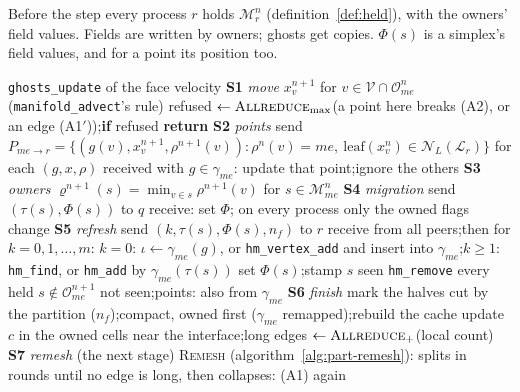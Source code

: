 \documentclass[10pt,a4paper]{article}
\theoremstyle{definition}
\newcommand{\fn}[1]{\texttt{#1}}
\begin{document}
Before the step every process $r$ holds $\mathcal{M}^n_r$
(definition~\ref{def:held}), with the owners' field values. Fields are
written by owners; ghosts get copies. $\Phi(s)$ is a simplex's field
values, and for a point its position too.

\begin{algorithm}[H]
  \caption{\textsc{Step}$(dt)$ on process $me$}
  \label{alg:part-step}
  \begin{algorithmic}[1]
    \State \fn{ghosts\_update} of the face velocity 
    \Statex \textbf{S1} \emph{move}
    \State $x^{n+1}_v$ for $v \in \mathcal{V} \cap \mathcal{O}^n_{me}$
      (\fn{manifold\_advect}'s rule)
    \State refused $\gets \textsc{Allreduce}_{\max}$(a point here breaks
      (A2), or an edge (A1$'$));\quad \textbf{if} refused \textbf{return}
    \Statex \textbf{S2} \emph{points}
      \State send $P_{me \to r} = \{ (g(v), x^{n+1}_v, \rho^{n+1}(v)) :
        \rho^n(v) = me,\ \mathrm{leaf}(x^n_v) \in \mathcal{N}_L(\mathcal{L}_r)
        \}$
    \EndFor
    \State for each $(g, x, \rho)$ received with $g \in \gamma_{me}$: update
      that point;\quad ignore the others 
    \Statex \textbf{S3} \emph{owners}
    \State $\varrho^{n+1}(s) = \min_{v \in s} \rho^{n+1}(v)$ for $s \in
      \mathcal{M}^n_{me}$ 
    \Statex \textbf{S4} \emph{migration}
      \State send $(\tau(s), \Phi(s))$ to $q$ 
    \EndFor
    \State receive: set $\Phi$; on every process only the owned flags change
    \Statex \textbf{S5} \emph{refresh}
     
      \State send $(k, \tau(s), \Phi(s), n_f)$ to $r$
    \EndFor
    \State receive from all peers;\quad then for $k = 0, 1, \ldots, m$:
    \State \quad $k = 0$: $\iota \gets \gamma_{me}(g)$, or
      \fn{hm\_vertex\_add} and insert into $\gamma_{me}$;\quad $k \ge 1$:
      \fn{hm\_find}, or \fn{hm\_add} by $\gamma_{me}(\tau(s))$
    \State \quad set $\Phi(s)$;\quad stamp $s$ seen
     
      \State \fn{hm\_remove} every held $s \notin \mathcal{O}^{n+1}_{me}$
        not seen;\quad points: also from $\gamma_{me}$
    \EndFor
    \Statex \textbf{S6} \emph{finish}
    \State mark the halves cut by the partition ($n_f$);\quad compact, owned
      first ($\gamma_{me}$ remapped);\quad rebuild the cache
    \State update $c$ in the owned cells near the interface;\quad long
      edges $\gets \textsc{Allreduce}_{+}$(local count)
    \Statex \textbf{S7} \emph{remesh} (the next stage)
    \State \textsc{Remesh} (algorithm~\ref{alg:part-remesh}): splits in
      rounds until no edge is long, then collapses: (A1) again
  \end{algorithmic}
\end{algorithm}
\end{document}
